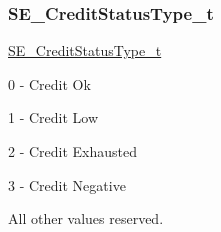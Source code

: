 \subsubsection{\texorpdfstring{S\+E\+\_\+\+Credit\+Status\+Type\+\_\+t}{SE\_CreditStatusType\_t}}
{\footnotesize\ttfamily \hyperlink{group__CreditStatusType_gadc768115dd9712a2356f01ac1aab6700}{S\+E\+\_\+\+Credit\+Status\+Type\+\_\+t}}

0 -\/ Credit Ok

1 -\/ Credit Low

2 -\/ Credit Exhausted

3 -\/ Credit Negative

All other values reserved. 